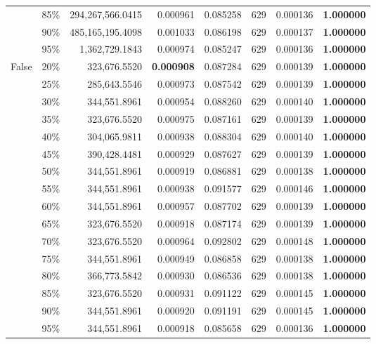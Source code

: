 \begin{table}[H]
\begin{tabular}{llrrrrrr}
 & 85\% & 294,267,566.0415 & 0.000961 & 0.085258 & \color{red} 629 & 0.000136 & \bfseries \color{red} 1.000000 \\
 & 90\% & 485,165,195.4098 & 0.001033 & 0.086198 & \color{red} 629 & 0.000137 & \bfseries \color{red} 1.000000 \\
 & 95\% & 1,362,729.1843 & 0.000974 & 0.085247 & \color{red} 629 & 0.000136 & \bfseries \color{red} 1.000000 \\
\multirow[c]{16}{*}{False} & 20\% & 323,676.5520 & \bfseries \color{red} 0.000908 & 0.087284 & \color{red} 629 & 0.000139 & \bfseries \color{red} 1.000000 \\
 & 25\% & \color{red} 285,643.5546 & 0.000973 & 0.087542 & \color{red} 629 & 0.000139 & \bfseries \color{red} 1.000000 \\
 & 30\% & 344,551.8961 & 0.000954 & 0.088260 & \color{red} 629 & 0.000140 & \bfseries \color{red} 1.000000 \\
 & 35\% & 323,676.5520 & 0.000975 & 0.087161 & \color{red} 629 & 0.000139 & \bfseries \color{red} 1.000000 \\
 & 40\% & 304,065.9811 & 0.000938 & 0.088304 & \color{red} 629 & 0.000140 & \bfseries \color{red} 1.000000 \\
 & 45\% & 390,428.4481 & 0.000929 & 0.087627 & \color{red} 629 & 0.000139 & \bfseries \color{red} 1.000000 \\
 & 50\% & 344,551.8961 & 0.000919 & 0.086881 & \color{red} 629 & 0.000138 & \bfseries \color{red} 1.000000 \\
 & 55\% & 344,551.8961 & 0.000938 & 0.091577 & \color{red} 629 & 0.000146 & \bfseries \color{red} 1.000000 \\
 & 60\% & 344,551.8961 & 0.000957 & 0.087702 & \color{red} 629 & 0.000139 & \bfseries \color{red} 1.000000 \\
 & 65\% & 323,676.5520 & 0.000918 & 0.087174 & \color{red} 629 & 0.000139 & \bfseries \color{red} 1.000000 \\
 & 70\% & 323,676.5520 & 0.000964 & 0.092802 & \color{red} 629 & 0.000148 & \bfseries \color{red} 1.000000 \\
 & 75\% & 344,551.8961 & 0.000949 & 0.086858 & \color{red} 629 & 0.000138 & \bfseries \color{red} 1.000000 \\
 & 80\% & 366,773.5842 & 0.000930 & 0.086536 & \color{red} 629 & 0.000138 & \bfseries \color{red} 1.000000 \\
 & 85\% & 323,676.5520 & 0.000931 & 0.091122 & \color{red} 629 & 0.000145 & \bfseries \color{red} 1.000000 \\
 & 90\% & 344,551.8961 & 0.000920 & 0.091191 & \color{red} 629 & 0.000145 & \bfseries \color{red} 1.000000 \\
 & 95\% & 344,551.8961 & 0.000918 & 0.085658 & \color{red} 629 & 0.000136 & \bfseries \color{red} 1.000000 \\
\bottomrule
\end{tabular}
\end{table}
